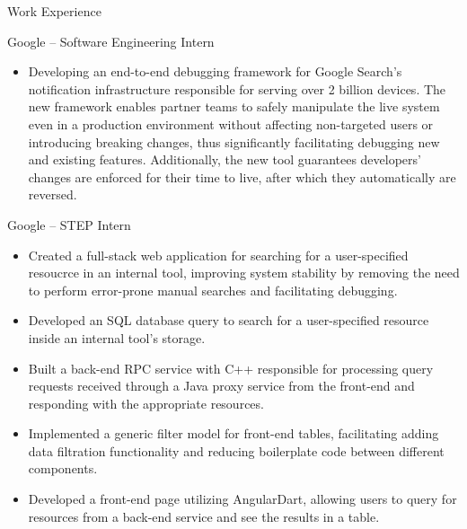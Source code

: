 \documentclass[]{article}
\newlength{\tabin}
\newlength{\secsep}
\newcommand{\lineunder}{\vspace*{-8pt} \\ \hspace*{-6pt} \hrulefill \\ \vspace*{-15pt}}
\newenvironment{tabbedsection}[1]{
  \begin{list}{}{
      \setlength{\itemsep}{0pt}
      \setlength{\labelsep}{0pt}
      \setlength{\labelwidth}{0pt}
      \setlength{\leftmargin}{\tabin}
      \setlength{\rightmargin}{\tabin}
      \setlength{\listparindent}{0pt}
      \setlength{\parsep}{0pt}
      \setlength{\parskip}{0pt}
      \setlength{\partopsep}{0pt}
      \setlength{\topsep}{#1}
    }
  \item[]
}{\end{list}}
\newenvironment{resume_section}[1]{
  \filbreak
  \vspace{2\secsep}
  \textsc{\large#1}
  \lineunder
  \begin{tabbedsection}{\secsep}
}{\end{tabbedsection}}
\newenvironment{resume_subsection}[2][]{
  \textbf{#2} \hfill {\footnotesize #1} \hspace{2em}
  \begin{tabbedsection}{0.5\secsep}
}{\end{tabbedsection}}
\newenvironment{subitems}{
  \renewcommand{\labelitemi}{-}
  \begin{itemize}
      \setlength{\labelsep}{1em}
}{\end{itemize}}
\begin{document}
\begin{resume_section}{Work Experience}

	\begin{resume_subsection}{Google -- Software Engineering Intern}

		\begin{subitems}

			\item Developing an end-to-end debugging framework for Google Search's notification
			infrastructure responsible for serving over 2 billion devices. The new framework enables
			partner teams to safely manipulate the live system even in a production environment
			without affecting non-targeted users or introducing breaking changes, thus significantly
			facilitating debugging new and existing features. Additionally, the new tool
			guarantees developers' changes are enforced for their time to live, after which
			they automatically are reversed.


		\end{subitems}

	\end{resume_subsection}

	\begin{resume_subsection}[Irvine, CA (2022.05 -- 2022.08)]{Google -- STEP Intern}

		\begin{subitems}

			\item Created a full-stack web application for searching for a user-specified resoucrce
			in an internal tool, improving system stability by removing the need to perform
			error-prone manual searches and facilitating debugging.

			\item Developed an SQL database query to search for a user-specified resource inside
			an internal tool's storage.

			\item Built a back-end RPC service with C++ responsible for processing query requests
			received through a Java proxy service from the front-end and responding with the
			appropriate resources.

			\item Implemented a generic filter model for front-end tables, facilitating adding
			data filtration functionality and reducing boilerplate code between different components.

			\item Developed a front-end page utilizing AngularDart, allowing users to query for
			resources from a back-end service and see the results in a table.

		\end{subitems}

	\end{resume_subsection}

\end{resume_section}
\end{document}
